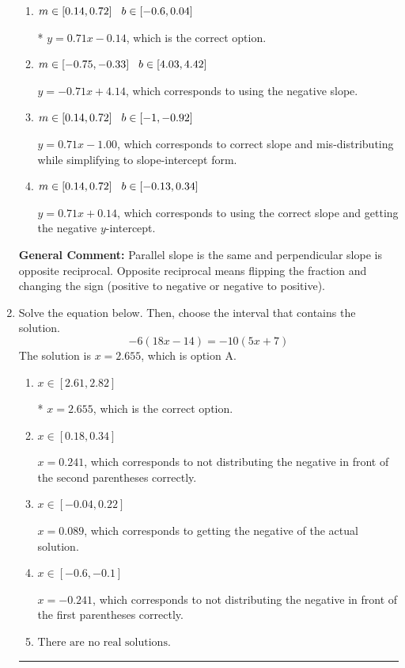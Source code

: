 \documentclass{extbook}[14pt]
\newcommand{\litem}[1]{\item #1

\rule{\textwidth}{0.4pt}}
\begin{document}
\begin{enumerate}
{\begin{enumerate}[label=\Alph*.]
 $y = 1.40x - 0.14$, which corresponds to using the reciprocal slope $(1/m)$.
\item \( m \in [0.14, 0.72] \hspace*{3mm} b \in [-0.6, 0.04] \)

* $y = 0.71x - 0.14$, which is the correct option.
\item \( m \in [-0.75, -0.33] \hspace*{3mm} b \in [4.03, 4.42] \)

 $y = -0.71x + 4.14$, which corresponds to using the negative slope.
\item \( m \in [0.14, 0.72] \hspace*{3mm} b \in [-1, -0.92] \)

 $y = 0.71x - 1.00$, which corresponds to correct slope and mis-distributing while simplifying to slope-intercept form.
\item \( m \in [0.14, 0.72] \hspace*{3mm} b \in [-0.13, 0.34] \)

 $y = 0.71x + 0.14$, which corresponds to using the correct slope and getting the negative $y$-intercept.
\end{enumerate}

\textbf{General Comment:} Parallel slope is the same and perpendicular slope is opposite reciprocal. Opposite reciprocal means flipping the fraction and changing the sign (positive to negative or negative to positive).
}
\litem{
Solve the equation below. Then, choose the interval that contains the solution.
\[ -6(18x -14) = -10(5x + 7) \]The solution is \( x = 2.655 \), which is option A.\begin{enumerate}[label=\Alph*.]
\item \( x \in [2.61, 2.82] \)

* $x = 2.655$, which is the correct option.
\item \( x \in [0.18, 0.34] \)

$x = 0.241$, which corresponds to not distributing the negative in front of the second parentheses correctly.
\item \( x \in [-0.04, 0.22] \)

$x = 0.089$, which corresponds to getting the negative of the actual solution.
\item \( x \in [-0.6, -0.1] \)

$x = -0.241$, which corresponds to not distributing the negative in front of the first parentheses correctly.
\item \( \text{There are no real solutions.} \)


\end{enumerate}}
\end{enumerate}
\end{document}
